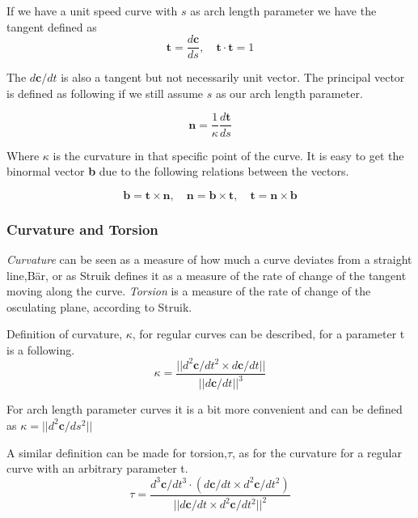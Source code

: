 If we have a unit speed curve with $s$ as arch length parameter we have the tangent defined as 
\begin{equation}
\textbf{t} =  \frac{d\textbf{c}}{ds} ,\quad \textbf{t} \cdot \textbf{t} = 1
\end{equation}

The $d\textbf{c}/dt$ is also a tangent but not necessarily unit vector. The principal vector is defined as following if we still assume $s$ as our arch length parameter.

\begin{equation}
\textbf{n} = \frac{1}{\kappa}\frac{d\textbf{t}}{ds} 
\end{equation}

Where $\kappa$ is the curvature in that specific point of the curve. It is easy to get the binormal vector \textbf{b} due to the following relations between the vectors.

\begin{equation}
\textbf{b} = \textbf{t} \times \textbf{n} ,\quad \textbf{n} = \textbf{b} \times \textbf{t} ,\quad \textbf{t} = \textbf{n} \times \textbf{b} 
\end{equation}

\subsubsection{Curvature and Torsion} \label{curvature}

\textit{Curvature} can be seen as a measure of how much a curve deviates from a straight line,Bär, or as Struik defines it as a measure of the rate of change of the tangent moving along the curve. \textit{Torsion} is a measure of the rate of change of the osculating plane, according to Struik.

\vspace{5mm} %

Definition of curvature, $\kappa$, for regular curves can be described, for a parameter t is a following. 
\begin{equation}
\kappa = \frac{|| d^2\textbf{c}/ dt^2 \times d\textbf{c}/dt ||}{||d\textbf{c}/dt||^3} 
\end{equation}

For arch length parameter curves it is a bit more convenient and can be defined as $\kappa = ||d^2 \textbf{c}/ ds^2||$

A similar definition can be made for torsion,$\tau$, as for the curvature for a regular curve with an arbitrary parameter t. 
\begin{equation}
\tau = \frac{ d^3\textbf{c}/ dt^3 \cdot(d\textbf{c}/dt \times d^2\textbf{c}/dt^2)}{||d\textbf{c}/dt \times d^2\textbf{c}/dt^2||^2} 
\end{equation}

